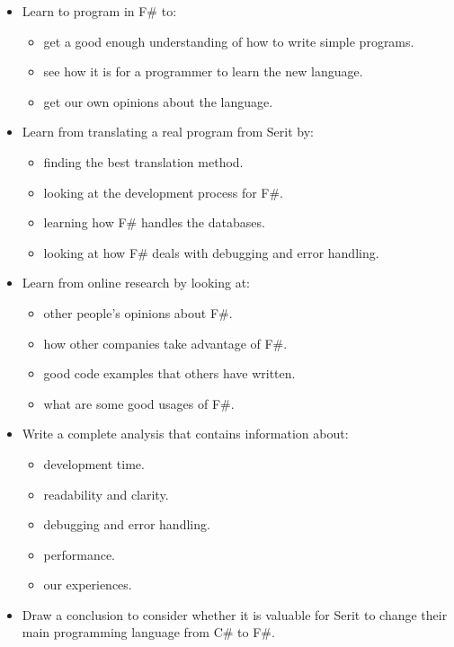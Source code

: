 \documentclass[12pt, a4paper]{article}
\begin{document}
\begin{itemize}

	\item Learn to program in F\# to:
	\begin{itemize}
		\item get a good enough understanding of how to write simple programs.
		\item see how it is for a programmer to learn the new language.
		\item get our own opinions about the language.
	\end{itemize}
	
	\item Learn from translating a real program from Serit by:
	\begin{itemize}
		\item finding the best translation method.
		\item looking at the development process for F\#.
		\item learning how F\# handles the databases.
		\item looking at how F\# deals with debugging and error handling.
		
	\end{itemize}
	\item Learn from online research by looking at:
	\begin{itemize}
		\item other people's opinions about F\#.
		\item how other companies take advantage of F\#.
		\item good code examples that others have written.
		\item what are some good usages of F\#.
	\end{itemize}
	
	\item Write a complete analysis that contains information about:
	\begin{itemize}
		\item development time.
		\item readability and clarity.
		\item debugging and error handling.
		\item performance.
		\item our experiences.
	\end{itemize}
	
	\item Draw a conclusion to consider whether it is valuable for Serit to change their main programming language from C\# to F\#.
	
\end{itemize}
\end{document}
